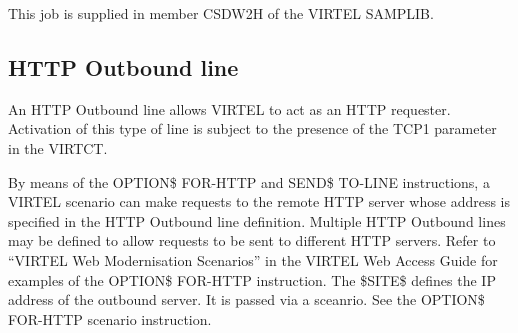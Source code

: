 \documentclass[letterpaper,10pt,english]{sphinxmanual}
\begin{document}
This job is supplied in member CSDW2H of the VIRTEL SAMPLIB.


\subsection{HTTP Outbound line}
\label{\detokenize{connectivity_guide:bookmark42}}\label{\detokenize{connectivity_guide:http-outbound-line}}
An HTTP Outbound line allows VIRTEL to act as an HTTP requester. Activation of this type of line is subject to the presence of the TCP1 parameter in the VIRTCT.

By means of the OPTION\$ FOR-HTTP and SEND\$ TO-LINE instructions, a VIRTEL scenario can make requests to the remote HTTP server whose address is specified in the HTTP Outbound line definition. Multiple HTTP Outbound lines may be defined to allow requests to be sent to different HTTP servers. Refer to “VIRTEL Web Modernisation Scenarios” in the VIRTEL Web Access Guide for examples of the OPTION\$ FOR-HTTP instruction. The \$SITE\$ defines the IP address of the outbound server. It is passed via a sceanrio. See the OPTION\$ FOR-HTTP scenario instruction.

\end{document}
